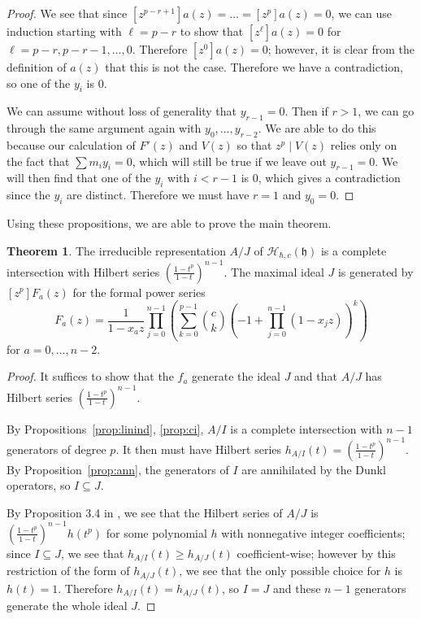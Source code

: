 \documentclass{amsart}
\numberwithin{equation}{section}
\theoremstyle{definition}
\newtheorem{theorem}[equation]{Theorem}
\newcommand{\h}{\mathfrak{h}}
\newcommand{\HH}{\mathcal{H}}
\begin{document}
\begin{proof}
We see that since $[z^{p-r+1}]a(z)=\dots=[z^p]a(z)=0$, we can use induction starting with $\ell=p-r$ to show that $[z^\ell]a(z)=0$ for $\ell=p-r,p-r-1,\dots,0$. Therefore $[z^0]a(z)=0$; however, it is clear from the definition of $a(z)$ that this is not the case. Therefore we have a contradiction, so one of the $y_i$ is $0$.

We can assume without loss of generality that $y_{r-1}=0$. Then if $r>1$, we can go through the same argument again with $y_0,\dots,y_{r-2}$. We are able to do this because our calculation of $F'(z)$ and $V(z)$ so that $z^p \mid V(z)$ relies only on the fact that $\sum m_iy_i=0$, which will still be true if we leave out $y_{r-1}=0$. We will then find that one of the $y_i$ with $i < r-1$ is $0$, which gives a contradiction since the $y_i$ are distinct. Therefore we must have $r=1$ and $y_0=0$. 



\end{proof}

Using these propositions, we are able to prove the main theorem.

\begin{theorem}\label{thm:main} The irreducible representation $A/J$  of $\HH_{\hbar,c}(\h)$ is a complete intersection with  Hilbert series $\left(\frac{1-t^p}{1-t}\right)^{n-1}$. The maximal ideal $J$ is generated by $[z^p]F_a(z)$ for the formal power series $$F_a(z)=\frac{1}{1-x_az} \prod_{j=0}^{n-1}\left( \sum_{k=0}^{p-1} \binom{c}{k}(-1+\prod_{j=0}^{n-1} (1-x_jz))^k\right)$$ for $a=0,\dots,n-2$.  \end{theorem} 

\begin{proof} It suffices to show that the $f_a$ generate the ideal $J$ and that $A/J$ has Hilbert series $\left(\frac{1-t^p}{1-t}\right)^{n-1}$. 

By Propositions~\ref{prop:linind}, \ref{prop:ci}, $A/I$ is a complete intersection with $n-1$ generators of degree $p$. It then must have Hilbert series $h_{A/I}(t)=\left(\frac{1-t^p}{1-t}\right)^{n-1}$. By Proposition~\ref{prop:ann}, the generators of $I$ are annihilated by the Dunkl operators, so $I \subseteq J$.

By Proposition 3.4 in \cite{BC1}, we see that the Hilbert series of $A/J$ is $\left(\frac{1-t^p}{1-t}\right)^{n-1}h(t^p)$ for some polynomial $h$ with nonnegative integer coefficients; since $I \subseteq J$, we see that $h_{A/I}(t) \ge h_{A/J}(t)$ coefficient-wise; however by this restriction of the form of $h_{A/J}(t)$, we see that the only possible choice for $h$ is $h(t)=1$. Therefore $h_{A/I}(t)=h_{A/J}(t)$, so $I=J$ and these $n-1$ generators generate the whole ideal $J$.

\end{proof}



\end{document}
